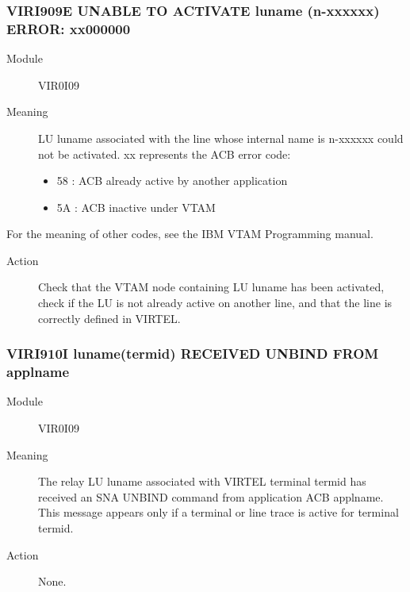 \documentclass[letterpaper,10pt,english]{sphinxmanual}
\begin{document}
\subsubsection{VIRI909E UNABLE TO ACTIVATE luname (n-xxxxxx) ERROR: xx000000}
\label{\detokenize{messages:viri909e-unable-to-activate-luname-n-xxxxxx-error-xx000000}}\begin{description}
\item[{Module}] \leavevmode
VIR0I09

\item[{Meaning}] \leavevmode
LU luname associated with the line whose internal name is n-xxxxxx could not be activated. xx represents the ACB error code:
\begin{itemize}
\item {} 
58 : ACB already active by another application

\item {} 
5A : ACB inactive under VTAM

\end{itemize}

\end{description}

For the meaning of other codes, see the IBM VTAM Programming manual.
\begin{description}
\item[{Action}] \leavevmode
Check that the VTAM node containing LU luname has been activated, check if the LU is not already active on another line, and that the line is correctly defined in VIRTEL.

\end{description}


\subsubsection{VIRI910I luname(termid) RECEIVED UNBIND FROM applname}
\label{\detokenize{messages:viri910i-luname-termid-received-unbind-from-applname}}\begin{description}
\item[{Module}] \leavevmode
VIR0I09

\item[{Meaning}] \leavevmode
The relay LU luname associated with VIRTEL terminal termid has received an SNA UNBIND command from application ACB applname. This message appears only if a terminal or line trace is active for terminal termid.

\item[{Action}] \leavevmode
None.

\end{description}
\end{document}
